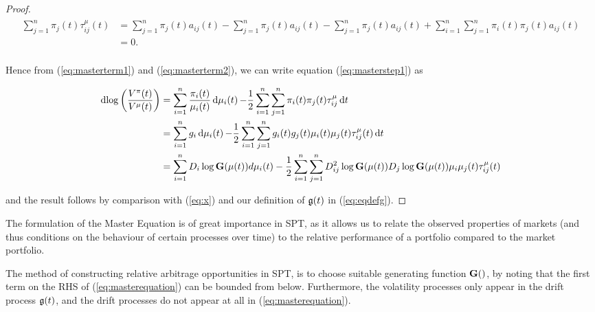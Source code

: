\documentclass[british]{amsart} \usepackage{lmodern}
\numberwithin{equation}{section} \numberwithin{figure}{section}
\theoremstyle{plain} \newtheorem{thm}{\protect\theoremname}[section]
\theoremstyle{definition} \newtheorem{defn}[thm]{\protect\definitionname}
\theoremstyle{plain} \newtheorem{assumption}[thm]{\protect\assumptionname}
\theoremstyle{plain} \newtheorem{lem}[thm]{\protect\lemmaname}
\theoremstyle{plain} \newtheorem{prop}[thm]{\protect\propositionname}
\theoremstyle{remark} \newtheorem{rem}[thm]{\protect\remarkname}
\theoremstyle{plain} \newtheorem{cor}[thm]{\protect\corollaryname}
\renewcommand{\d}[1]{\mathop{\mathrm{d}{#1}}}
\begin{document}
\begin{proof}
\newcommand{\apii}{\sum_{j=1}^{n}\pi_{j}(t)a_{ij}(t)}
\newcommand{\apipi}{\sum_{i=1}^{n}\sum_{j=1}^{n}\pi_{i}(t)\pi_{j}(t)a_{ij}(t)}

  \begin{gather} 
    \begin{split} 
    \sum_{j=1}^{n} \pi_{j}(t) \tau_{ij}^{\mu} (t)
    &= 
    \sum_{j=1}^{n} \pi_{j}(t) a_{ij}(t) - \apii -
    \sum_{j=1}^{n} \pi_{j}(t) a_{ij}(t) + \apipi \\
    &= 0. \\
   \end{split} 
  \end{gather}

Hence from (\ref{eq:masterterm1}) and (\ref{eq:masterterm2}), we can write
equation (\ref{eq:masterstep1}) as

  \begin{gather} 
    \begin{split} 
      \d{ \log{ \left( \frac{V^{\pi}(t) }{ V^{\mu}(t) } \right) } } 
        &= 
            \sum_{i=1}^{n} \frac{\pi_{i}(t)}{\mu_{i}(t)} \d{\mu_{i}(t)} 
            - \frac{1}{2} \sum_{i=1}^{n} \sum_{j=1}^{n} 
            \pi_{i}(t)\pi_{j}(t)\tau_{ij}^{\mu}\d{t} \\
        &= \sum_{i=1}^{n} g_{i}\d{\mu_{i}(t)}  -\frac{1}{2} 
            \sum_{i=1}^{n} \sum_{j=1}^{n} 
            g_{i}(t)g_{j}(t)\mu_{i}(t)\mu_{j}(t)\tau_{ij}^{\mu}(t) \d{t} \\
        &= \sum_{i=1}^{n}  D_{i}\log{\Gmu} d{\mu_{i}(t)} -
            \frac{1}{2}\sum_{i=1}^{n} \sum_{j=1}^{n} 
             D_{ij}^2 \log{\Gmu} D_{j}\log{\Gmu} 
            \mu_{i}\mu_{j}(t)\tau_{ij}^{\mu}(t)
    \end{split} 
  \end{gather}

  and the result follows by comparison with (\ref{eq:x}) and our definition of
  $\mathfrak{g}(t)$ in (\ref{eq:eqdefg}).

\end{proof}

The formulation of the Master Equation is of great importance in SPT, as it
allows us to relate the observed properties of markets (and thus conditions on
the behaviour of certain processes over time) to the relative performance of a
portfolio compared to the market portfolio. 

The method of constructing relative arbitrage opportunities in SPT, is to choose
suitable generating function $\G$, by noting that the first term on the RHS of
(\ref{eq:masterequation}) can be bounded from below. Furthermore, the volatility
processes only appear in the drift process $\mathfrak{g}(t)$, and the drift processes do not
appear at all in (\ref{eq:masterequation}).
\end{document}
